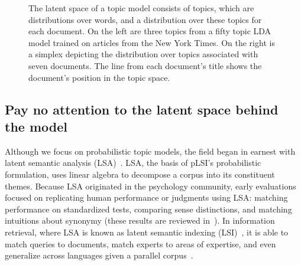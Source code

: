 \begin{figure}[t]
{      \label{fig:nyttopics:doc}
    }
    \caption{The latent space of a topic model consists of topics,
      which are distributions over words, and a distribution over these
      topics for each document.  On the left are three topics from a
      fifty topic LDA model trained on articles from the New York
      Times.  On the right is a simplex depicting the distribution
      over topics associated with seven documents.  The line from each
      document's title shows the document's position in the topic
      space.}
\label{fig:nyttopics:big}
\end{figure}








\subsection*{Pay no attention to the latent space behind the model}

Although we focus on probabilistic topic models, the field began in
earnest with latent semantic analysis (LSA)~\cite{landauer-97}.  LSA,
the basis of pLSI's probabilistic formulation, uses linear algebra to
decompose a corpus into its constituent themes.  Because LSA
originated in the psychology community, early evaluations focused on
replicating human performance or judgments using LSA: matching
performance on standardized tests, comparing sense distinctions, and
matching intuitions about synonymy (these results are reviewed
in~\cite{landauer-02}).  In information retrieval, where LSA is known
as latent semantic indexing (LSI)~\cite{deerwester-90}, it is able to
match queries to documents, match experts to areas of expertise, and
even generalize across languages given a parallel
corpus~\cite{berry-95}.

